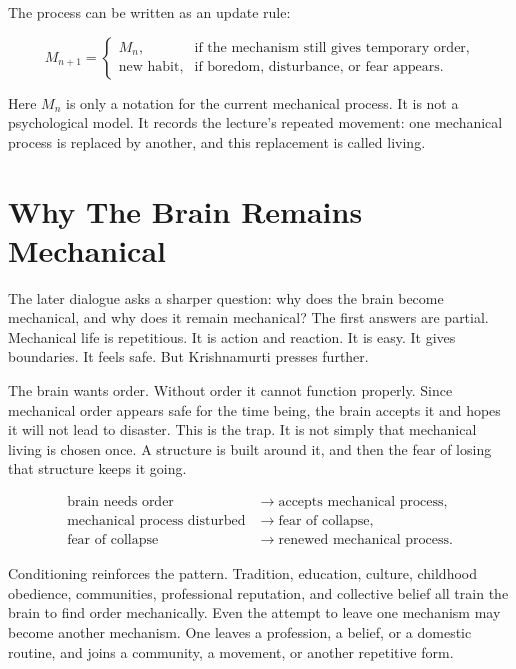The process can be written as an update rule:

\begin{equation}
M_{n+1}
=
\begin{cases}
M_n, & \text{if the mechanism still gives temporary order},\\
\text{new habit}, & \text{if boredom, disturbance, or fear appears}.
\end{cases}
\end{equation}

Here \(M_n\) is only a notation for the current mechanical process. It is not a psychological model. It records the lecture's repeated movement: one mechanical process is replaced by another, and this replacement is called living.

\section{Why The Brain Remains Mechanical}

The later dialogue asks a sharper question: why does the brain become mechanical, and why does it remain mechanical? The first answers are partial. Mechanical life is repetitious. It is action and reaction. It is easy. It gives boundaries. It feels safe. But Krishnamurti presses further.

The brain wants order. Without order it cannot function properly. Since mechanical order appears safe for the time being, the brain accepts it and hopes it will not lead to disaster. This is the trap. It is not simply that mechanical living is chosen once. A structure is built around it, and then the fear of losing that structure keeps it going.

\begin{align}
\text{brain needs order}
&\longrightarrow
\text{accepts mechanical process}, \\
\text{mechanical process disturbed}
&\longrightarrow
\text{fear of collapse}, \\
\text{fear of collapse}
&\longrightarrow
\text{renewed mechanical process}.
\end{align}

Conditioning reinforces the pattern. Tradition, education, culture, childhood obedience, communities, professional reputation, and collective belief all train the brain to find order mechanically. Even the attempt to leave one mechanism may become another mechanism. One leaves a profession, a belief, or a domestic routine, and joins a community, a movement, or another repetitive form.

